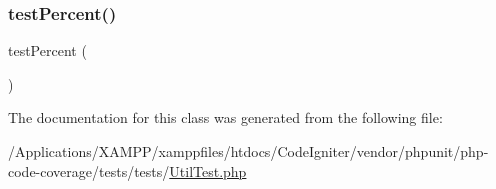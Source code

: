 \subsubsection{\texorpdfstring{test\+Percent()}{testPercent()}}
{\footnotesize\ttfamily test\+Percent (\begin{DoxyParamCaption}{ }\end{DoxyParamCaption})}



The documentation for this class was generated from the following file\+:\begin{DoxyCompactItemize}
\item 
/\+Applications/\+X\+A\+M\+P\+P/xamppfiles/htdocs/\+Code\+Igniter/vendor/phpunit/php-\/code-\/coverage/tests/tests/\mbox{\hyperlink{_util_test_8php}{Util\+Test.\+php}}\end{DoxyCompactItemize}
